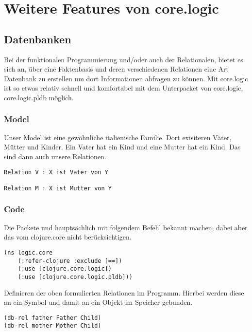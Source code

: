 \section{Weitere Features von core.logic}

\subsection{Datenbanken}

Bei der funktionalen Programmierung und/oder auch der Relationalen, bietet es sich an, über eine Faktenbasis und deren verschiedenen Relationen eine Art Datenbank zu erstellen um dort Informationen abfragen zu können. Mit core.logic ist so etwas relativ schnell und komfortabel mit dem Unterpacket von core.logic, core.logic.pldb möglich.

\subsubsection{Model}

Unser Model ist eine gewöhnliche italienische Familie. Dort exisiteren Väter, Mütter und Kinder. Ein Vater hat ein Kind und eine Mutter hat ein Kind. Das sind dann auch unsere Relationen.

\begin{lstlisting}
Relation V : X ist Vater von Y

Relation M : X ist Mutter von Y
\end{lstlisting}

\subsubsection{Code}

Die Packete  und hauptsächlich  mit folgendem Befehl bekannt machen, dabei aber das \code{==} vom clojure.core nicht berücksichtigen.

\begin{lstlisting}
(ns logic.core	
	(:refer-clojure :exclude [==])
	(:use [clojure.core.logic])
  	(:use [clojure.core.logic.pldb]))
\end{lstlisting}

Definieren der oben formulierten Relationen im Programm. Hierbei werden diese an ein Symbol und damit an ein Objekt im Speicher gebunden.

\begin{lstlisting}
(db-rel father Father Child)
(db-rel mother Mother Child)
\end{lstlisting}

